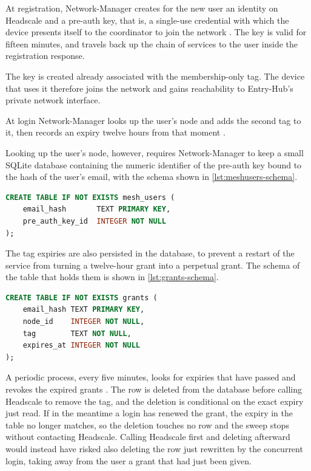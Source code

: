 At registration, Network-Manager creates for the new user an identity on Headscale and a pre-auth key,
that is, a single-use credential with which the device presents itself to the coordinator to join the network
\cite{ramusb-code-mesh-user}. The key is valid for fifteen minutes, and travels back up the chain of services to
the user inside the registration response.

The key is created already associated with the membership-only tag. The device that uses it therefore joins the
network and gains reachability to Entry-Hub's private network interface.

At login Network-Manager looks up the user's node and adds the second tag to it, then records an expiry
twelve hours from that moment \cite{ramusb-code-grant}.

Looking up the user's node, however, requires Network-Manager to keep a small SQLite database
containing the numeric identifier of the pre-auth key bound to the hash of the user's email, with the
schema shown in \autoref{lst:meshusers-schema}.

\begin{lstlisting}[language=sql, caption={Schema of the email-to-pre-auth-key mapping table, from
\texttt{meshusers.go} \cite{ramusb-code-meshusers-schema}.}, label={lst:meshusers-schema}]
CREATE TABLE IF NOT EXISTS mesh_users (
	email_hash       TEXT PRIMARY KEY,
	pre_auth_key_id  INTEGER NOT NULL
);
\end{lstlisting}

The tag expiries are also persisted in the database, to prevent a restart of the service from turning
a twelve-hour grant into a perpetual grant. The schema of the table that holds them is shown in
\autoref{lst:grants-schema}.

\begin{lstlisting}[language=sql, caption={Schema of the access grant table, from \texttt{store.go}
\cite{ramusb-code-grants-schema}.}, label={lst:grants-schema}]
CREATE TABLE IF NOT EXISTS grants (
	email_hash TEXT PRIMARY KEY,
	node_id    INTEGER NOT NULL,
	tag        TEXT NOT NULL,
	expires_at INTEGER NOT NULL
);
\end{lstlisting}

A periodic process, every five minutes, looks for expiries that have passed and revokes the expired grants
\cite{ramusb-code-sweep}. The row is deleted from the database before calling Headscale to remove
the tag, and the deletion is conditional on the exact expiry just read.
If in the meantime a login has renewed the grant, the expiry in the table no longer matches, so the deletion
touches no row and the sweep stops without contacting Headscale.
Calling Headscale first and deleting afterward would instead have risked also deleting the row
just rewritten by the concurrent login, taking away from the user a grant that had just been given.

